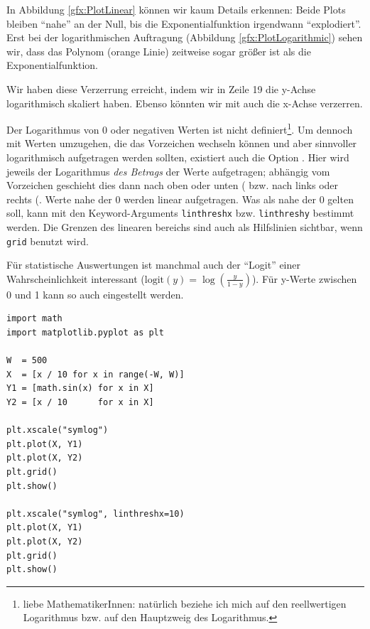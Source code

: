 In Abbildung \ref{gfx:PlotLinear} können wir kaum Details erkennen: Beide Plots bleiben \enquote{nahe} an der Null, bis die Exponentialfunktion irgendwann \enquote{explodiert}. Erst bei der logarithmischen Auftragung (Abbildung \ref{gfx:PlotLogarithmic}) sehen wir, dass das Polynom (orange Linie) zeitweise sogar größer ist als die Exponentialfunktion.

Wir haben diese Verzerrung erreicht, indem wir in Zeile 19 die y-Achse logarithmisch skaliert haben. Ebenso könnten wir mit  auch die x-Achse verzerren.

Der Logarithmus von 0 oder negativen Werten ist nicht definiert\footnote{liebe MathematikerInnen: natürlich beziehe ich mich auf den reellwertigen Logarithmus bzw. auf den Hauptzweig des Logarithmus.}. Um dennoch mit Werten umzugehen, die das Vorzeichen wechseln können und aber sinnvoller logarithmisch aufgetragen werden sollten, existiert auch die Option . Hier wird jeweils der Logarithmus \emph{des Betrags} der Werte aufgetragen; abhängig vom Vorzeichen geschieht dies dann nach oben oder unten ( bzw. nach links oder rechts (. Werte nahe der 0 werden linear aufgetragen. Was als nahe der 0 gelten soll, kann mit den Keyword-Arguments \texttt{linthreshx} bzw. \texttt{linthreshy} bestimmt werden. Die Grenzen des linearen bereichs sind auch als Hilfslinien sichtbar, wenn \texttt{grid} benutzt wird.

Für statistische Auswertungen ist manchmal auch der \enquote{Logit} einer Wahrscheinlichkeit interessant ($\text{logit}(y) = \log(\frac{y}{1-y})$). Für y-Werte zwischen 0 und 1 kann so auch  eingestellt werden.

\begin{codebox}
\begin{verbatim}
import math
import matplotlib.pyplot as plt

W  = 500
X  = [x / 10 for x in range(-W, W)]
Y1 = [math.sin(x) for x in X]
Y2 = [x / 10      for x in X]

plt.xscale("symlog")
plt.plot(X, Y1)
plt.plot(X, Y2)
plt.grid()
plt.show()

plt.xscale("symlog", linthreshx=10)
plt.plot(X, Y1)
plt.plot(X, Y2)
plt.grid()
plt.show()
\end{verbatim}
\end{codebox}

